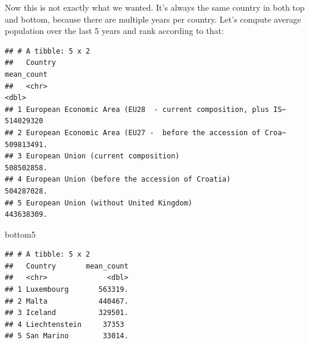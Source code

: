 \documentclass[]{book}
\newenvironment{Shaded}{\begin{snugshade}}{\end{snugshade}}
\newcommand{\KeywordTok}[1]{\textcolor[rgb]{0.13,0.29,0.53}{\textbf{#1}}}
\newcommand{\DataTypeTok}[1]{\textcolor[rgb]{0.13,0.29,0.53}{#1}}
\newcommand{\DecValTok}[1]{\textcolor[rgb]{0.00,0.00,0.81}{#1}}
\newcommand{\StringTok}[1]{\textcolor[rgb]{0.31,0.60,0.02}{#1}}
\newcommand{\OperatorTok}[1]{\textcolor[rgb]{0.81,0.36,0.00}{\textbf{#1}}}
\newcommand{\NormalTok}[1]{#1}
\theoremstyle{definition}
\theoremstyle{definition}
\theoremstyle{definition}
\theoremstyle{remark}
\begin{document}
Now this is not exactly what we wanted. It's always the same country in
both top and bottom, because there are multiple years per country. Let's
compute average population over the last 5 years and rank according to
that:

\begin{Shaded}
\end{Shaded}

\begin{verbatim}
## # A tibble: 5 x 2
##   Country                                                       mean_count
##   <chr>                                                              <dbl>
## 1 European Economic Area (EU28  - current composition, plus IS~ 514029320 
## 2 European Economic Area (EU27 -  before the accession of Croa~ 509813491.
## 3 European Union (current composition)                          508502858.
## 4 European Union (before the accession of Croatia)              504287028.
## 5 European Union (without United Kingdom)                       443638309.
\end{verbatim}

\begin{Shaded}
\begin{Highlighting}[]
\NormalTok{bottom5}
\end{Highlighting}
\end{Shaded}

\begin{verbatim}
## # A tibble: 5 x 2
##   Country       mean_count
##   <chr>              <dbl>
## 1 Luxembourg       563319.
## 2 Malta            440467.
## 3 Iceland          329501.
## 4 Liechtenstein     37353 
## 5 San Marino        33014.
\end{verbatim}
\end{document}
